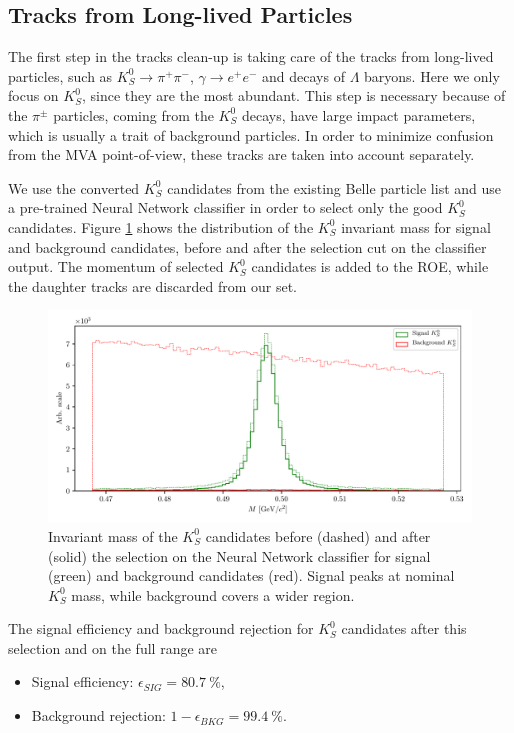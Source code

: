 \subsection{Tracks from Long-lived Particles}

The first step in the tracks clean-up is taking care of the tracks from long-lived particles, such as $K_S^0 \to \pi^+\pi^-$, $\gamma \to e^+ e^-$ and decays of $\Lambda$ baryons. Here we only focus on $K_S^0$, since they are the most abundant. This step is necessary because of the $\pi^\pm$ particles, coming from the $K_S^0$ decays, have large impact parameters, which is usually a trait of background particles. In order to minimize confusion from the MVA point-of-view, these tracks are taken into account separately.

We use the converted $K_S^0$ candidates from the existing Belle particle list and use a pre-trained Neural Network classifier in order to select only the good $K_S^0$ candidates. Figure \ref{fig:ROE_V0} shows the distribution of the $K_S^0$ invariant mass for signal and background candidates, before and after the selection cut on the classifier output. The momentum of selected $K_S^0$ candidates is added to the ROE, while the daughter tracks are discarded from our set.

\begin{figure}[H]
	\centering
	\captionsetup{width=0.8\linewidth}
	\includegraphics[width=\linewidth]{fig/ROECleanup_V0}
	\caption{Invariant mass of the $K_S^0$ candidates before (dashed) and after (solid) the selection on the Neural Network classifier for signal (green) and background candidates (red). Signal peaks at nominal $K_S^0$ mass, while background covers a wider region.}
	\label{fig:ROE_V0}
\end{figure}

The signal efficiency and background rejection for $K_S^0$ candidates after this selection and on the full range are
\begin{itemize}
	\item Signal efficiency: $\epsilon_{SIG} = 80.7~\%$,
	\item Background rejection: $1-\epsilon_{BKG} = 99.4~\%$.
\end{itemize}

